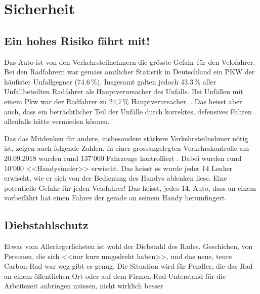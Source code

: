 \chapter{Sicherheit}

\section{Ein hohes Risiko fährt mit!}

Das Auto ist von den Verkehrsteilnehmern die grösste Gefahr für den Velofahrer. Bei den
Radfahrern war gemäss amtlicher Statistik in Deutschland ein PKW der
häufister Unfallgegner (74.6\,\%). Insgesamt galten jedoch 43.3\,\%
aller Unfallbeteilten Radfahrer als Hauptverursacher des Unfalls. Bei
Unfällen mit einem Pkw war der Radfahrer zu 24,7\,\% Hauptverursacher.
\cite{StatistischesBundesamt2017Fahrradunfaelle2017}. Das heisst aber auch,
dass ein beträchtlicher Teil der Unfälle durch korrektes, defensives Fahren
allenfalls hätte vermieden können.

Das das Mitdenken für andere, insbesondere stärkere Verkehrsteilnehmer nötig
ist, zeigen auch folgende Zahlen. In einer grossangelegten Verkehrskontrolle
am 20.09.2018 wurden rund 137'000
Fahrzeuge kontrolliert \cite{cfr2018handyamsteuer}. Dabei wurden rund 10'000
<<Handysünder>> erwischt. Das heisst es wurde jeder 14 Lenker erwischt, wie er
sich von der Bedienung des Handys ablenken liess. Eine potentielle Gefahr für
jeden Velofahrer! Das heisst, jedes 14. Auto, dass an einem vorbeifährt hat einen Fahrer
der gerade an seinem Handy herumfingert.

\section{Diebstahlschutz}

Etwas vom Allerärgerlichsten ist wohl der Diebstahl des Rades. Geschichen,
von Personen, die sich <<nur kurz umgedreht haben>>, und das neue, teure
Carbon-Rad war weg gibt es genug. Die Situation wird für Pendler, die das
Rad an einem öffentlichen Ort oder auf dem Firmen-Rad-Unterstand für die
Arbeitszeit anbringen müssen, nicht wirklich besser

